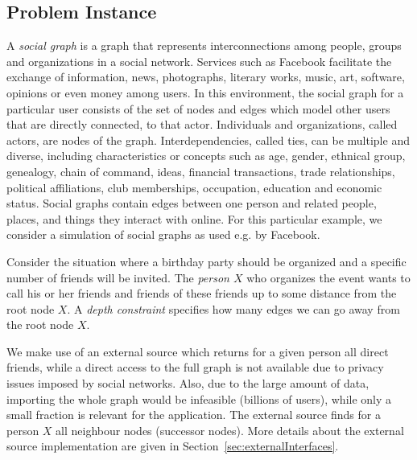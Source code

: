\documentclass[a4paper, titlepage]{article}
\begin{document}
\subsection{Problem Instance}
A \emph{social graph} is a graph that represents 
interconnections among people, groups 
and organizations in a social network. Services such as 
Facebook facilitate the exchange 
of information, news, photographs, literary works, music, 
art, software, opinions or even 
money among users. In this environment, the social graph 
for a particular user consists 
of the set of nodes and edges which model other users that 
are directly connected, to that actor. 
Individuals and organizations, called actors, are nodes of 
the graph. Interdependencies, 
called ties, can be multiple and diverse, including 
characteristics or concepts such as age, 
gender, ethnical group, genealogy, chain of command, ideas, financial 
transactions, trade relationships, 
political affiliations, club memberships, occupation, 
education and economic status. 
Social graphs contain edges between one person and related 
people, places, and things they interact 
with online. For this particular example, we consider a 
simulation of social graphs as used e.g. by Facebook. 

Consider the situation where a birthday party should be 
organized and a specific number of friends will be invited. 
The \emph{person $X$} who organizes the event wants to 
call his or her friends and friends of these friends up to 
some distance from the root node $X$. A \emph{depth 
constraint} specifies how many edges we can go away from 
the root node $X$.
 

We make use of an external source which returns for a given 
person all direct friends, while a direct access to the 
full graph is not available due to privacy issues imposed 
by social networks. Also, due to the large amount of data, 
importing the whole graph would be infeasible (billions of 
users), while only a small fraction is relevant for the 
application. The external source finds for a person $X$ all 
neighbour nodes (successor nodes). More details about the 
external source implementation are given in 
Section~\ref{sec:externalInterfaces}. 
               
\end{document}
